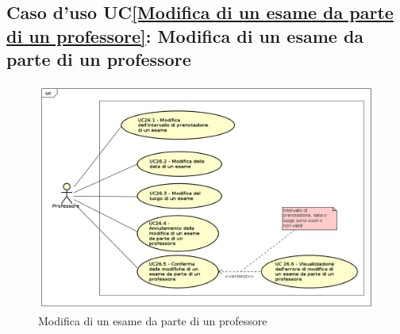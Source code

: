 \subsection{Caso d'uso UC\ref{Modifica di un esame da parte di un professore}: Modifica di un esame da parte di un professore}
\begin{figure} [H]
	\centering
	\includegraphics[scale=0.45]{./img/UseCaseDiagram026.png}
	\caption{Modifica di un esame da parte di un professore}\label{}
\end{figure}
